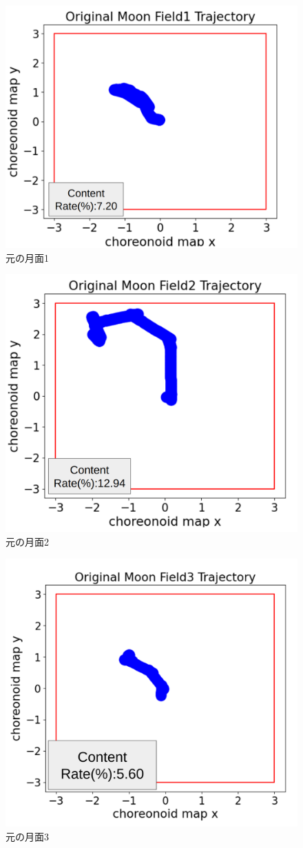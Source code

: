 \begin{figure}[htbp]
  \begin{center}
   \includegraphics[width=0.6\linewidth]{images/origin_moon_field1.png}
   \caption{元の月面1}
   \label{fig:origin_moon_field1}
  \end{center}
 \end{figure}
 \begin{figure}[htbp]
  \begin{center}
   \includegraphics[width=0.6\linewidth]{images/origin_moon_field2.png}
   \caption{元の月面2}
   \label{fig:origin_moon_field2}
  \end{center}
 \end{figure}
 \begin{figure}[htbp]
  \begin{center}
   \includegraphics[width=0.6\linewidth]{images/origin_moon_trajectory3.png}
   \caption{元の月面3}
   \label{fig:origin_moon_trajectory3}
  \end{center}
 \end{figure}
